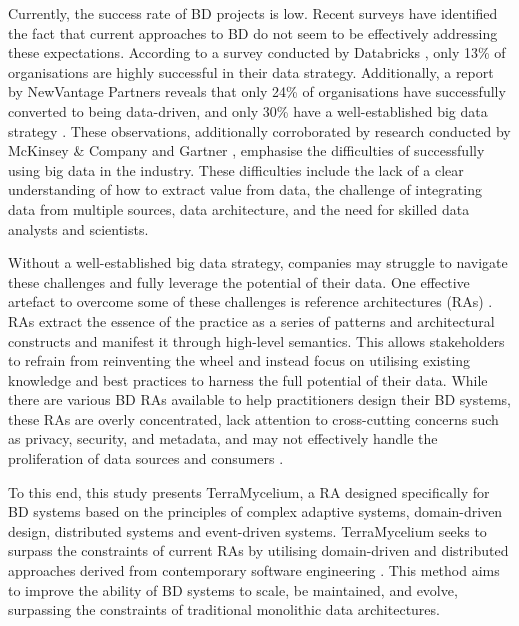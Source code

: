 \documentclass[journal]{IEEEtran}
\begin{document}
Currently, the success rate of BD projects is low. Recent surveys have identified the fact that current approaches to BD do not seem to be effectively addressing these expectations. According to a survey conducted by Databricks \cite{DataBricksSurvey}, only 13\% of organisations are highly successful in their data strategy. Additionally, a report by NewVantage Partners reveals that only 24\% of organisations have successfully converted to being data-driven, and only 30\% have a well-established big data strategy \cite{newvantagepartners2023}. These observations, additionally corroborated by research conducted by McKinsey \& Company \cite{analytics2016age} and Gartner \cite{Nash}, emphasise the difficulties of successfully using big data in the industry. These difficulties include the lack of a clear understanding of how to extract value from data, the challenge of integrating data from multiple sources, data architecture, and the need for skilled data analysts and scientists. 

Without a well-established big data strategy, companies may struggle to navigate these challenges and fully leverage the potential of their data. One effective artefact to overcome some of these challenges is reference architectures (RAs) \cite{Cloutier2010}. RAs extract the essence of the practice as a series of patterns and architectural constructs and manifest it through high-level semantics. This allows stakeholders to refrain from reinventing the wheel and instead focus on utilising existing knowledge and best practices to harness the full potential of their data. While there are various BD RAs available to help practitioners design their BD systems, these RAs are overly concentrated, lack attention to cross-cutting concerns such as privacy, security, and metadata, and may not effectively handle the proliferation of data sources and consumers \cite{ataei2022state,AtaeiACIS}.

To this end, this study presents TerraMycelium, a RA designed specifically for BD systems based on the principles of complex adaptive systems, domain-driven design, distributed systems and event-driven systems. TerraMycelium seeks to surpass the constraints of current RAs by utilising domain-driven and distributed approaches derived from contemporary software engineering \cite{ataei2023application}. This method aims to improve the ability of BD systems to scale, be maintained, and evolve, surpassing the constraints of traditional monolithic data architectures.
\end{document}

